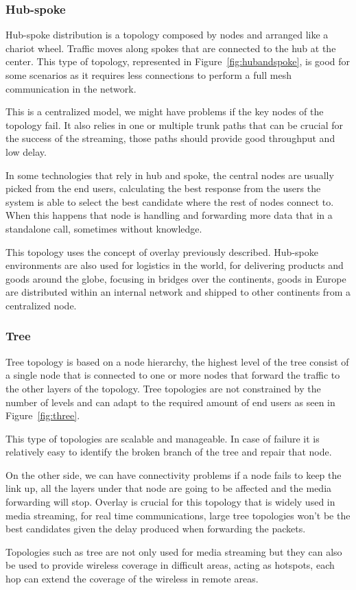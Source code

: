 \subsubsection{Hub-spoke}

Hub-spoke distribution is a topology composed by nodes and arranged like a chariot wheel. Traffic moves along spokes that are connected to the hub at the center. This type of topology, represented in Figure~\ref{fig:hubandspoke}, is good for some scenarios as it requires less connections to perform a full mesh communication in the network. 

This is a centralized model, we might have problems if the key nodes of the topology fail. It also relies in one or multiple trunk paths that can be crucial for the success of the streaming, those paths should provide good throughput and low delay.

In some technologies that rely in hub and spoke, the central nodes are usually picked from the end users, calculating the best response from the users the system is able to select the best candidate where the rest of nodes connect to. When this happens that node is handling and forwarding more data that in a standalone call, sometimes without knowledge.

This topology uses the concept of overlay previously described. Hub-spoke environments are also used for logistics in the world, for delivering products and goods around the globe, focusing in bridges over the continents, goods in Europe are distributed within an internal network and shipped to other continents from a centralized node.  

\subsubsection{Tree}
 
Tree topology is based on a node hierarchy, the highest level of the tree consist of a single node that is connected to one or more nodes that forward the traffic to the other layers of the topology. Tree topologies are not constrained by the number of levels and can adapt to the required amount of end users as seen in Figure~\ref{fig:three}.  

This type of topologies are scalable and manageable. In case of failure it is relatively easy to identify the broken branch of the tree and repair that node.

On the other side, we can have connectivity problems if a node fails to keep the link up, all the layers under that node are going to be affected and the media forwarding will stop. Overlay is crucial for this topology that is widely used in media streaming, for real time communications, large tree topologies won't be the best candidates given the delay produced when forwarding the packets.

Topologies such as tree are not only used for media streaming but they can also be used to provide wireless coverage in difficult areas, acting as hotspots, each hop can extend the coverage of the wireless in remote areas.

